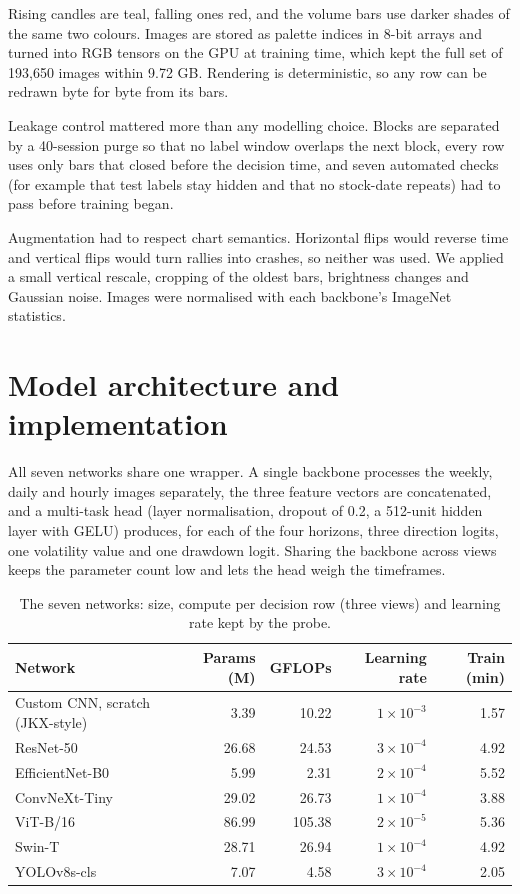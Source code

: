 \documentclass[11pt,a4paper]{article}
\begin{document}
Rising candles are teal, falling ones red, and the volume bars use darker shades of the same two colours. Images are stored as palette indices in 8-bit arrays and turned into RGB tensors on the GPU at training time, which kept the full set of 193,650 images within 9.72 GB. Rendering is deterministic, so any row can be redrawn byte for byte from its bars.

Leakage control mattered more than any modelling choice. Blocks are separated by a 40-session purge so that no label window overlaps the next block, every row uses only bars that closed before the decision time, and seven automated checks (for example that test labels stay hidden and that no stock-date repeats) had to pass before training began.

Augmentation had to respect chart semantics. Horizontal flips would reverse time and vertical flips would turn rallies into crashes, so neither was used. We applied a small vertical rescale, cropping of the oldest bars, brightness changes and Gaussian noise. Images were normalised with each backbone's ImageNet statistics.

\section{Model architecture and implementation}

All seven networks share one wrapper. A single backbone processes the weekly, daily and hourly images separately, the three feature vectors are concatenated, and a multi-task head (layer normalisation, dropout of 0.2, a 512-unit hidden layer with GELU) produces, for each of the four horizons, three direction logits, one volatility value and one drawdown logit. Sharing the backbone across views keeps the parameter count low and lets the head weigh the timeframes.

\begin{table}[h]
\centering
\caption{The seven networks: size, compute per decision row (three views) and learning rate kept by the probe.}
\label{tab:models}
\begin{tabular}{lrrrr}
\toprule
Network & Params (M) & GFLOPs & Learning rate & Train (min) \\
\midrule
Custom CNN, scratch (JKX-style) & 3.39 & 10.22 & $1\times10^{-3}$ & 1.57 \\
ResNet-50 & 26.68 & 24.53 & $3\times10^{-4}$ & 4.92 \\
EfficientNet-B0 & 5.99 & 2.31 & $2\times10^{-4}$ & 5.52 \\
ConvNeXt-Tiny & 29.02 & 26.73 & $1\times10^{-4}$ & 3.88 \\
ViT-B/16 & 86.99 & 105.38 & $2\times10^{-5}$ & 5.36 \\
Swin-T & 28.71 & 26.94 & $1\times10^{-4}$ & 4.92 \\
YOLOv8s-cls & 7.07 & 4.58 & $3\times10^{-4}$ & 2.05 \\
\bottomrule
\end{tabular}
\end{table}
\end{document}
